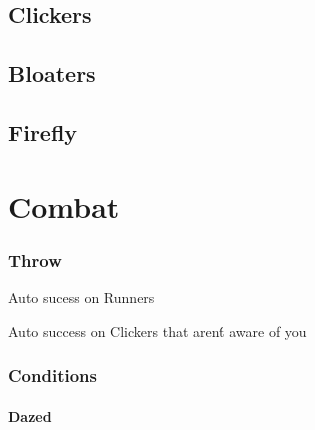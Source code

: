 \documentclass[10pt,twoside,twocolumn]{book}
\begin{document}
\section{Clickers}

\section{Bloaters}

\section{Firefly}

%
%
\mainmatter
\chapter{Combat}

\subsection{Throw}

\begin{rpg-list}
    \item Auto sucess on Runners
    \item Auto success on Clickers that aren\'t aware of you
\end{rpg-list}

\subsection{Conditions}

\subsubsection{Dazed}
\end{document}
